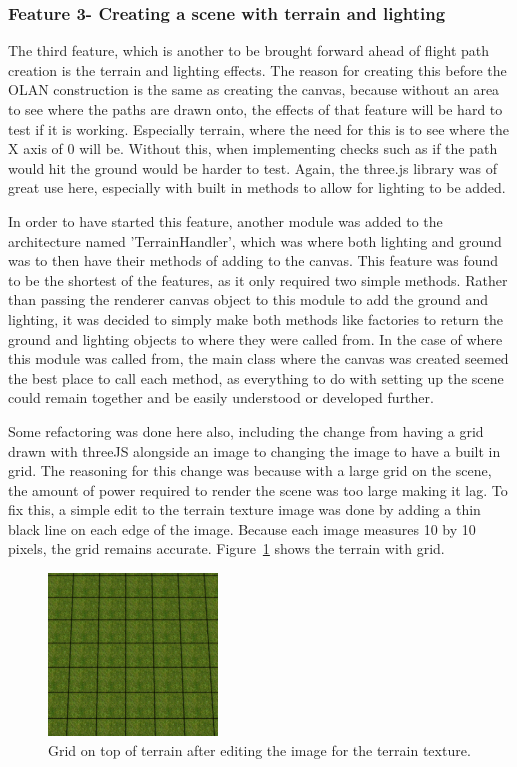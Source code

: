 \subsubsection{Feature 3- Creating a scene with terrain and lighting}
The third feature, which is another to be brought forward ahead of flight path creation is the terrain and lighting effects. The reason for creating this before the OLAN construction is the same as creating the canvas, because without an area to see where the paths are drawn onto, the effects of that feature will be hard to test if it is working. Especially terrain, where the need for this is to see where the X axis of 0 will be. Without this, when implementing checks such as if the path would hit the ground would be harder to test. Again, the three.js library was of great use here, especially with built in methods to allow for lighting to be added.

In order to have started this feature, another module was added to the architecture named 'TerrainHandler', which was where both lighting and ground was to then have their methods of adding to the canvas. This feature was found to be the shortest of the features, as it only required two simple methods. Rather than passing the renderer canvas object to this module to add the ground and lighting, it was decided to simply make both methods like factories to return the ground and lighting objects to where they were called from. In the case of where this module was called from, the main class where the canvas was created seemed the best place to call each method, as everything to do with setting up the scene could remain together and be easily understood or developed further.

Some refactoring was done here also, including the change from having a grid drawn with threeJS alongside an image to changing the image to have a built in grid. The reasoning for this change was because with a large grid on the scene, the amount of power required to render the scene was too large making it lag. To fix this, a simple edit to the terrain texture image was done by adding a thin black line on each edge of the image. Because each image measures 10 by 10 pixels, the grid remains accurate. Figure~\ref{fig:grid} shows the terrain with grid.

\begin{figure}[h]
  \centering
      \includegraphics[width=0.4\textwidth]{images/ground.png}
  \caption{Grid on top of terrain after editing the image for the terrain texture.}
  \label{fig:grid}
\end{figure}

